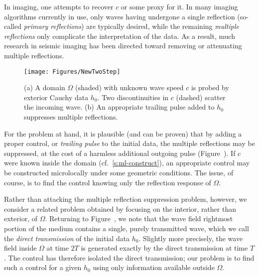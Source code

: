 \documentclass[10pt]{article}
\theoremstyle{plain}
\theoremstyle{definition}
\theoremstyle{remark}
\numberwithin{theorem}{section}
\numberwithin{example}{section}
\numberwithin{equation}{section}
\numberwithin{figure}{section}
\newcommand\sref[1]{\textsection\ref{#1}}					%
\begin{document}
In imaging, one attempts to recover $c$ or some proxy for it. In many imaging algorithms currently in use, only waves having undergone a single reflection (so-called \emph{primary reflections}) are typically desired, while the remaining \emph{multiple reflections} only complicate the interpretation of the data. As a result, much research in seismic imaging has been directed toward removing or attenuating multiple reflections.

\begin{figure}
\hfill
\texttt{[image: Figures/NewTwoStep]}
\hfill
{}

\caption{(a) A domain $\Omega$ (shaded) with unknown wave speed $c$ is probed by exterior Cauchy data $h_0$. Two discontinuities in $c$ (dashed) scatter the incoming wave. (b) An appropriate trailing pulse added to $h_0$ suppresses multiple reflections.}
\label{f:mr-demo}
\end{figure}

For the problem at hand, it is plausible (and can be proven) that by adding a proper control, or \emph{trailing pulse} to the initial data, the multiple reflections may be suppressed, at the cost of a harmless additional outgoing pulse (Figure~). If $c$ were known inside the domain (cf.~\sref{s:ml-construct}), an appropriate control may be constructed microlocally under some geometric conditions. The issue, of course, is to find the control knowing only the reflection response of $\Omega$. 

Rather than attacking the multiple reflection suppression problem, however, we consider a related problem obtained by focusing on the interior, rather than exterior, of $\Omega$. Returning to Figure~, we note that the wave field rightmost portion of the medium contains a single, purely transmitted wave, which we call the \emph{direct transmission} of the initial data $h_0$. Slightly more precisely, the wave field inside $\Omega$ at time $2T$ is generated exactly by the direct transmission at time $T$. The control has therefore isolated the direct transmission; our problem is to find such a control for a given $h_0$ using only information available outside $\Omega$.



\end{document}
